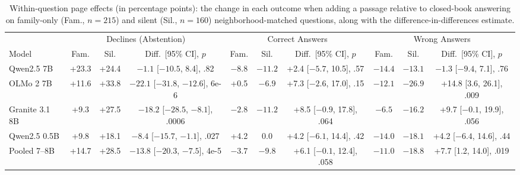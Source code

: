 \begin{table}[t]
\centering
\footnotesize
\setlength{\tabcolsep}{2.4pt}
\begin{tabular}{lccccccccc}
\toprule
 & \multicolumn{3}{c}{Declines (Abstention)} & \multicolumn{3}{c}{Correct Answers} & \multicolumn{3}{c}{Wrong Answers} \\
\cmidrule(lr){2-4}\cmidrule(lr){5-7}\cmidrule(lr){8-10}
Model & Fam. & Sil. & Diff.\ [95\% CI], $p$ & Fam. & Sil. & Diff.\ [95\% CI], $p$ & Fam. & Sil. & Diff.\ [95\% CI], $p$ \\
\midrule
Qwen2.5 7B & +23.3 & +24.4 & $-1.1$ [$-10.5$, 8.4], .82 & $-8.8$ & $-11.2$ & +2.4 [$-5.7$, 10.5], .57 & $-14.4$ & $-13.1$ & $-1.3$ [$-9.4$, 7.1], .76 \\
OLMo 2 7B & +11.6 & +33.8 & $-22.1$ [$-31.8$, $-12.6$], 6e-6 & +0.5 & $-6.9$ & +7.3 [$-2.6$, 17.0], .15 & $-12.1$ & $-26.9$ & +14.8 [3.6, 26.1], .009 \\
Granite 3.1 8B & +9.3 & +27.5 & $-18.2$ [$-28.5$, $-8.1$], .0006 & $-2.8$ & $-11.2$ & +8.5 [$-0.9$, 17.8], .064 & $-6.5$ & $-16.2$ & +9.7 [$-0.1$, 19.9], .056 \\
Qwen2.5 0.5B & +9.8 & +18.1 & $-8.4$ [$-15.7$, $-1.1$], .027 & +4.2 & 0.0 & +4.2 [$-6.1$, 14.4], .42 & $-14.0$ & $-18.1$ & +4.2 [$-6.4$, 14.6], .44 \\
\midrule
Pooled 7--8B & +14.7 & +28.5 & $-13.8$ [$-20.3$, $-7.5$], 4e-5 & $-3.7$ & $-9.8$ & +6.1 [$-0.1$, 12.4], .058 & $-11.0$ & $-18.8$ & +7.7 [1.2, 14.0], .019 \\
\bottomrule
\end{tabular}
\caption{Within-question page effects (in percentage points): the change in each outcome when adding a passage relative to closed-book answering on family-only (Fam., $n=215$) and silent (Sil., $n=160$) neighborhood-matched questions, along with the difference-in-differences estimate.}
\label{tab:did_full}
\end{table}